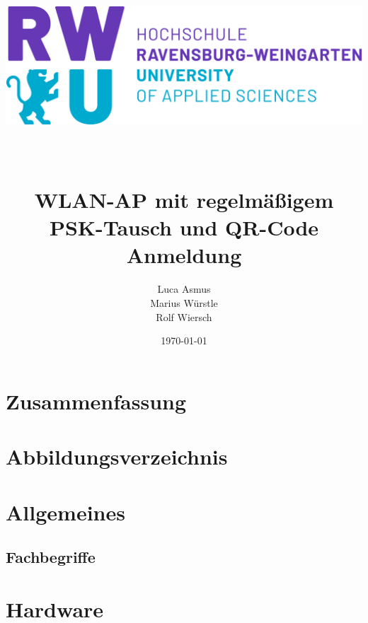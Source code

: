 \documentclass[a4paper,11pt,singlespacing]{article}
\begin{document}
	\setlength{\parindent}{0ex}
	
	\begin{titlepage}
		\author{Luca Asmus\\ Marius Würstle\\Rolf Wiersch}
		\title{\includegraphics[scale=0.3]{rwu_logo_hor-lila-cyan_rgb_0} \\ ~\\ ~\\ WLAN-AP mit regelmäßigem PSK-Tausch und QR-Code Anmeldung \vspace{8cm}}
		\date{\today}
		\maketitle
		\thispagestyle{empty}
    	\end{titlepage}
    	
    	\section{Zusammenfassung}
    	\tableofcontents
    	\newpage
    	
    	\section{Abbildungsverzeichnis}
    	\listoffigures
    	\newpage
    	
    	\section{Allgemeines}
    	
    	\subsection{Fachbegriffe}
    	
      	\section{Hardware}
\end{document}
